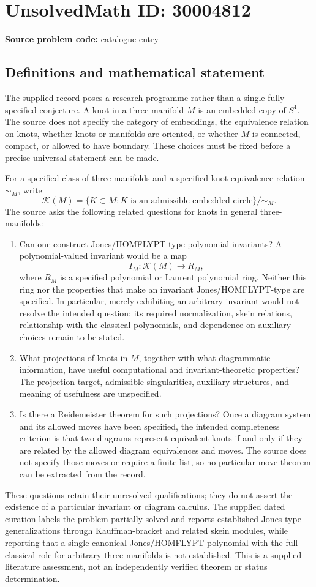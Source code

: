 \documentclass[11pt]{article}
\begin{document}
\section*{UnsolvedMath ID: 30004812}
\textbf{Source problem code:} catalogue entry
\subsection{Definitions and mathematical statement}
The supplied record poses a research programme rather than a single fully specified conjecture. A knot in a three-manifold \(M\) is an embedded copy of \(S^1\). The source does not specify the category of embeddings, the equivalence relation on knots, whether knots or manifolds are oriented, or whether \(M\) is connected, compact, or allowed to have boundary. These choices must be fixed before a precise universal statement can be made.

For a specified class of three-manifolds and a specified knot equivalence relation \(\sim_M\), write
\[
\mathcal K(M)=\{K\subset M:K\text{ is an admissible embedded circle}\}/\!\sim_M.
\]
The source asks the following related questions for knots in general three-manifolds:
\begin{enumerate}
\item Can one construct Jones/HOMFLYPT-type polynomial invariants? A polynomial-valued invariant would be a map
\[
I_M:\mathcal K(M)\longrightarrow R_M,
\]
where \(R_M\) is a specified polynomial or Laurent polynomial ring. Neither this ring nor the properties that make an invariant Jones/HOMFLYPT-type are specified. In particular, merely exhibiting an arbitrary invariant would not resolve the intended question; its required normalization, skein relations, relationship with the classical polynomials, and dependence on auxiliary choices remain to be stated.
\item What projections of knots in \(M\), together with what diagrammatic information, have useful computational and invariant-theoretic properties? The projection target, admissible singularities, auxiliary structures, and meaning of usefulness are unspecified.
\item Is there a Reidemeister theorem for such projections? Once a diagram system and its allowed moves have been specified, the intended completeness criterion is that two diagrams represent equivalent knots if and only if they are related by the allowed diagram equivalences and moves. The source does not specify those moves or require a finite list, so no particular move theorem can be extracted from the record.
\end{enumerate}
These questions retain their unresolved qualifications; they do not assert the existence of a particular invariant or diagram calculus. The supplied dated curation labels the problem partially solved and reports established Jones-type generalizations through Kauffman-bracket and related skein modules, while reporting that a single canonical Jones/HOMFLYPT polynomial with the full classical role for arbitrary three-manifolds is not established. This is a supplied literature assessment, not an independently verified theorem or status determination.
\end{document}
